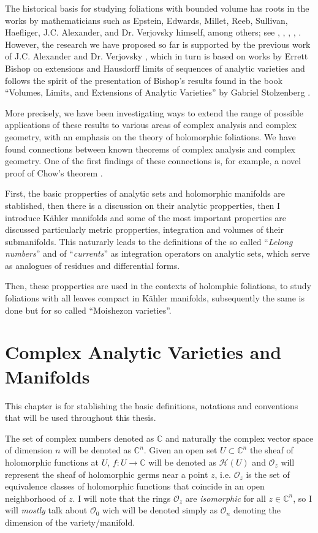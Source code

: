 \documentclass[12pt,twoside,a4paper]{report}
\newcommand{\co}{\ensuremath{\mathbb C }}
\newcommand{\con}{\ensuremath{\mathbb{C}^n}}
\newcommand{\osheaf}{\ensuremath{\mathcal O }}
\begin{document}
  The historical basis for studying foliations with bounded volume has roots in the works by mathematicians such as Epstein, Edwards, Millet, Reeb, Sullivan, Haefliger, J.C. Alexander, and Dr. Verjovsky himself, among others; see \cite{EMS}, \cite{V-A}, \cite{E-V}, \cite{Epstein1}, \cite{Epstein2}. However, the research we have proposed so far is supported by the previous work of J.C. Alexander and Dr. Verjovsky \cite{A-V}, which in turn is based on works by Errett Bishop \cite{Bishop} on extensions and Hausdorff limits of sequences of analytic varieties and follows the spirit of the presentation of Bishop's results found in the book ``Volumes, Limits, and Extensions of Analytic Varieties'' by Gabriel Stolzenberg \cite{Stolzenberg}.

  More precisely, we have been investigating ways to extend the range of possible applications of these results to various areas of complex analysis and complex geometry, with an emphasis on the theory of holomorphic foliations. We have found connections between known theorems of complex analysis and complex geometry. One of the first findings of these connections is, for example, a novel proof of Chow's theorem \cite{Chow}.

  First, the basic propperties of analytic sets and holomorphic manifolds are stablished, then there is a discussion on their analytic propperties, then I introduce Kähler manifolds and some of the most important properties are discussed particularly metric propperties, integration and volumes of their submanifolds. This naturarly leads to the definitions of the so called ``\emph{Lelong numbers}'' and of ``\emph{currents}'' as integration operators on analytic sets, which serve as analogues of residues and differential forms.

  Then, these propperties are used in the contexts of holomphic foliations, to study foliations with all leaves compact in Kähler manifolds, subsequently the same is done but for so called ``Moishezon varieties''.

  \section{Complex Analytic Varieties and Manifolds}
  This chapter is for stablishing the basic definitions, notations and conventions that will be used throughout this thesis.

  The set of complex numbers denoted as $\co$ and naturally the complex vector space of dimension $n$ will be denoted as $\con$. Given an open set $U\subset\con$ the sheaf of holomorphic functions at $U$, $f:U\rightarrow\co$ will be denoted as $\mathcal{H}(U)$ and $\osheaf_{z}$ will represent the sheaf of holomorphic germs near a point $z$, i.e. $\osheaf_{z}$ is the set of equivalence classes of holomorphic functions that coincide in an open neighborhood of $z$. I will note that the rings $\osheaf_{z}$ are \emph{isomorphic} for all $z\in\con$, so I will \emph{mostly} talk about $\osheaf_{0}$ wich will be denoted simply as $\osheaf_{n}$ denoting the dimension of the variety/manifold.
\end{document}
